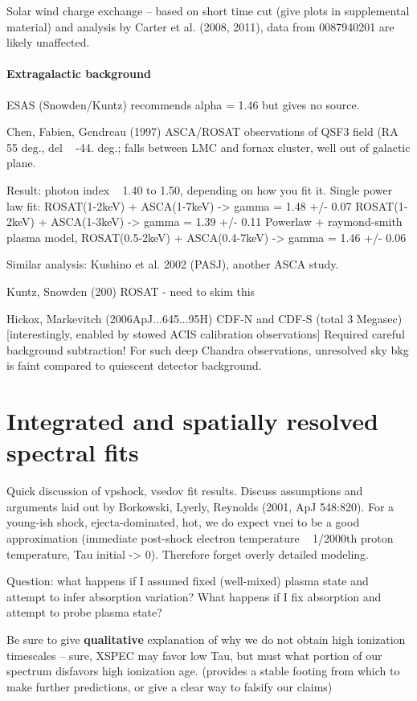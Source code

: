 \documentclass[twocolumn,tighten,trackchanges]{aastex6}
\begin{document}
Solar wind charge exchange -- based on short time cut (give plots in
supplemental material) and analysis by Carter et al. (2008, 2011),
data from 0087940201 are likely unaffected.

\paragraph{Extragalactic background}

ESAS (Snowden/Kuntz) recommends alpha = 1.46 but gives no source.

Chen, Fabien, Gendreau (1997)
  ASCA/ROSAT observations of QSF3 field (RA ~ 55 deg., del ~ -44. deg.; falls
  between LMC and fornax cluster, well out of galactic plane.

  Result: photon index ~ 1.40 to 1.50, depending on how you fit it.
  Single power law fit:
    ROSAT(1-2keV) + ASCA(1-7keV) -> gamma = 1.48 +/- 0.07
    ROSAT(1-2keV) + ASCA(1-3keV) -> gamma = 1.39 +/- 0.11
  Powerlaw + raymond-smith plasma model,
    ROSAT(0.5-2keV) + ASCA(0.4-7keV) -> gamma = 1.46 +/- 0.06

Similar analysis:
Kushino et al. 2002 (PASJ), another ASCA study.

Kuntz, Snowden (200)
    ROSAT - need to skim this

Hickox, Markevitch (2006ApJ...645...95H)
    CDF-N and CDF-S (total 3 Megasec)
    [interestingly, enabled by stowed ACIS calibration observations]
    Required careful background subtraction!
      For such deep Chandra observations, unresolved sky bkg is faint compared
      to quiescent detector background.

\section{Integrated and spatially resolved spectral fits} \label{sec:spec}

Quick discussion of vpshock, vsedov fit results.
Discuss assumptions and arguments laid out by Borkowski, Lyerly, Reynolds
(2001, ApJ 548:820).
For a young-ish shock, ejecta-dominated, hot, we do expect vnei to be a good
approximation (immediate post-shock electron temperature ~ 1/2000th proton
temperature, Tau initial -> 0).
Therefore forget overly detailed modeling.

Question:
what happens if I assumed fixed (well-mixed) plasma state and attempt to infer
absorption variation?
What happens if I fix absorption and attempt to probe plasma state?

Be sure to give \textbf{qualitative} explanation of why we do not obtain high
ionization timescales -- sure, XSPEC may favor low Tau, but must what portion
of our spectrum disfavors high ionization age. (provides a stable footing from
which to make further predictions, or give a clear way to falsify our claims)
\end{document}
